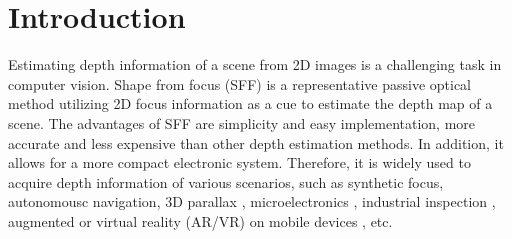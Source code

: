 \documentclass[a4paper,fleqn]{cas-dc}
\begin{document}
\maketitle

\section{Introduction}\label{Introduction}
Estimating depth information of a scene from 2D images is a challenging task in computer vision. Shape from focus (SFF) is a representative passive optical method utilizing 2D focus information as a cue to estimate the depth map of a scene. The advantages of SFF are simplicity and easy implementation, more accurate and less expensive than other depth estimation methods. In addition, it allows for a more compact electronic system. Therefore, it is widely used to acquire depth information of various scenarios, such as synthetic focus, autonomousc navigation\cite{greg2021dual,chao2020multi}, 3D parallax \cite{jeon2020ring}, microelectronics \cite{mahmood2012nonlinear}, industrial inspection \cite{alicona2021}, augmented or virtual reality (AR/VR) on mobile devices \cite{surh2017noise,suwajanakorn2015depth}, etc.
\end{document}
